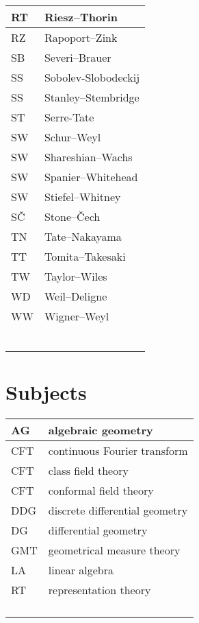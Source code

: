 \documentclass{amsart}
\numberwithin{equation}{section}
\theoremstyle{plain}
\numberwithin{equation}{section}
\theoremstyle{remark}
\begin{document}
\begin{longtable}{l|l}
RT & Riesz--Thorin\\ \hline
RZ & Rapoport--Zink\\ \hline
SB & Severi--Brauer\\ \hline
SS & Sobolev-Slobodeckij\\ \hline
SS & Stanley--Stembridge\\ \hline
ST & Serre-Tate\\ \hline
SW & Schur--Weyl\\ \hline
SW & Shareshian--Wachs\\ \hline
SW & Spanier--Whitehead\\ \hline
SW & Stiefel--Whitney\\ \hline
SČ & Stone--Čech\\ \hline
TN & Tate--Nakayama\\ \hline
TT & Tomita--Takesaki\\ \hline
TW & Taylor--Wiles\\ \hline
WD & Weil--Deligne\\ \hline
WW & Wigner--Weyl\\ \hline
 & \\ \hline
 & \\ \hline
 & \\ \hline
 & \\ \hline
 & \\ \hline
 & \\ \hline
\end{longtable}

\section{Subjects}

\begin{longtable}{l|l}
\hline
AG & algebraic geometry \\ \hline
CFT  & continuous Fourier transform\\ \hline
CFT & class field theory\\ \hline
CFT & conformal field theory\\ \hline
DDG & discrete differential geometry\\ \hline
DG & differential geometry\\ \hline
GMT  & geometrical measure theory\\ \hline
LA & linear algebra  \\ \hline
RT & representation theory\\ \hline
 & \\ \hline
 & \\ \hline
 & \\ \hline
 & \\ \hline
\end{longtable}
\end{document}
